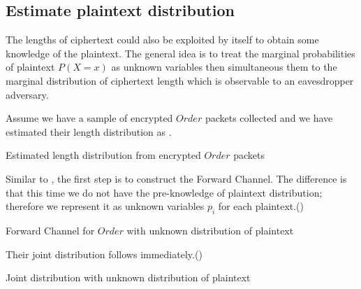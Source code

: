 \subsection{Estimate plaintext distribution}
The lengths of ciphertext could also be exploited by itself to obtain some knowledge of the plaintext. The general idea is to treat the marginal probabilities of plaintext $P(X=x)$ as unknown variables then simultaneous them to the marginal distribution of ciphertext length which is observable to an eavesdropper adversary.

\begin{example}
Assume we have a sample of encrypted $Order$ packets collected and we have estimated their length distribution as .
\begin{table}[H]
\begin{center}
{}
\end{center}
\caption{Estimated length distribution from encrypted $Order$ packets}
\label{Tbl: Estimated length distribution from encrypted Order packets}
\end{table}

Similar to , the first step is to construct the Forward Channel. The difference is that this time we do not have the pre-knowledge of plaintext distribution; therefore we represent it as unknown variables $p_i$ for each plaintext.()

\begin{table}[H]
\begin{center}
{}
\end{center}
\caption{Forward Channel for $Order$ with unknown distribution of plaintext}
\label{Tbl: Forward Channel for Order with unknown distribution of plaintext}
\end{table}

Their joint distribution follows immediately.()

\begin{table}[H]
\begin{center}
{}
\end{center}
\caption{Joint distribution with unknown distribution of plaintext}
\label{Tbl: Joint distribution with unknown distribution of plaintext}
\end{table}


\end{example}
